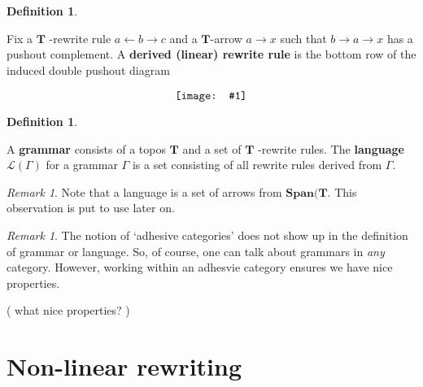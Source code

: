 \documentclass{amsart}
\newcommand{\defn}[1]{\textbf{#1}}
\newcommand{\cat}[1]{\mathbf{#1}}
\newcommand{\diagram}[1]{\raisebox{-0.5\height}{\texttt{[image: \#1]}}}
\newcommand{\Span}{\mathbf{Span}}
\newcommand{\edit}[1]{\textcolor{editcolour}{(#1)}}
\theoremstyle{remark}
\newtheorem{remark}[theorem]{Remark}
\theoremstyle{definition}
\newtheorem{definition}[theorem]{Definition}
\begin{document}
\begin{definition}
  \label{df:dpo_derived-rewrite-rule} 
	
  Fix a \( \cat{T} \) -rewrite rule \( a \gets b \to c \) and a
  $ \cat{T} $-arrow $ a \to x $ such that $ b \to a \to x $ has a 
  pushout complement. A \defn{derived (linear) rewrite rule} is the
  bottom row of the induced double pushout diagram 
  \[ 
    \diagram{diag_rw_derived-rule}
  \]
 
\end{definition}

\begin{definition}
  \label{df:dpo_grammar}

  A \defn{ grammar } consists of a topos \( \cat{T} \) and a set of
  \( \cat{T} \) -rewrite rules. The \textbf{language}
  \( \mathcal{L} ( \Gamma ) \) for a grammar \( \Gamma \) is a set
  consisting of all rewrite rules derived from \( \Gamma \).
  
\end{definition}

\begin{remark}

  Note that a language is a set of arrows from \( \Span ( \cat{T}
  \). This observation is put to use later on.   
  
\end{remark}

\begin{remark}

  The notion of `adhesive categories' does not show up in the
  definition of grammar or language.  So, of course, one can talk
  about grammars in \emph{any} category.  However, working within an
  adhesvie category ensures we have nice properties.

  \edit{ what nice properties? } 
\end{remark}


\section{Non-linear rewriting} \label{sec:non-linear-rewriting}

\end{document}
